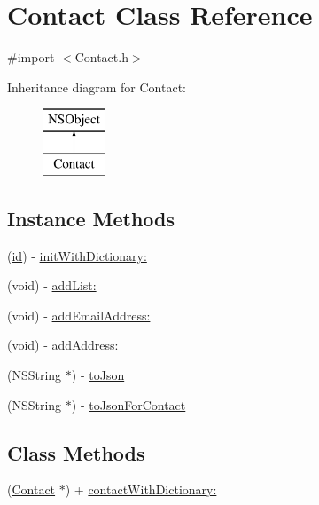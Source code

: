 \hypertarget{interface_contact}{\section{Contact Class Reference}
\label{interface_contact}
}


{\ttfamily \#import $<$Contact.\-h$>$}

Inheritance diagram for Contact\-:\begin{figure}[H]
\begin{center}
\leavevmode
\includegraphics[height=2.000000cm]{interface_contact}
\end{center}
\end{figure}
\subsection*{Instance Methods}
\begin{DoxyCompactItemize}
\item 
(\hyperlink{interface_contact_aa31847b281001bb11f2e8e50c039c3b2}{id}) -\/ \hyperlink{interface_contact_a899404ecb81550be559c297f3c8302eb}{init\-With\-Dictionary\-:}
\item 
(void) -\/ \hyperlink{interface_contact_a57dd8a4ba092145487a90ddc52ee57bf}{add\-List\-:}
\item 
(void) -\/ \hyperlink{interface_contact_a1eac37e0e1065a838a21d5153837d7d6}{add\-Email\-Address\-:}
\item 
(void) -\/ \hyperlink{interface_contact_a990cab58fd441204d41595534d92d838}{add\-Address\-:}
\item 
(N\-S\-String $\ast$) -\/ \hyperlink{interface_contact_a57f764a589a1c7099e0b4ed76138fe98}{to\-Json}
\item 
(N\-S\-String $\ast$) -\/ \hyperlink{interface_contact_ad6ad5b340a8cbdea7330f56c764525e2}{to\-Json\-For\-Contact}
\end{DoxyCompactItemize}
\subsection*{Class Methods}
\begin{DoxyCompactItemize}
\item 
(\hyperlink{interface_contact}{Contact} $\ast$) + \hyperlink{interface_contact_aa05ff62d981764acd92474352457e248}{contact\-With\-Dictionary\-:}
\end{DoxyCompactItemize}
